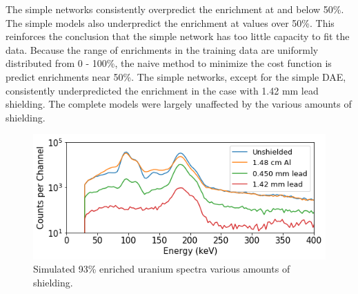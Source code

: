 The simple networks consistently overpredict the enrichment at and below 50\%. The simple models also underpredict the enrichment at values over 50\%. This reinforces the conclusion that the simple network has too little capacity to fit the data. Because the range of enrichments in the training data are uniformly distributed from 0 - 100\%, the naive method to minimize the cost function is predict enrichments near 50\%. The simple networks, except for the simple DAE, consistently underpredicted the enrichment in the case with 1.42 mm lead shielding. The complete models were largely unaffected by the various amounts of shielding.


\begin{figure}[H]
	\centering
	\includegraphics[width=0.8\linewidth]{images/simulated_uranium_shielding.png}
	\caption{Simulated 93\% enriched uranium spectra various amounts of shielding.}
	\label{fig:simulated_uranium_shielding}
\end{figure}

